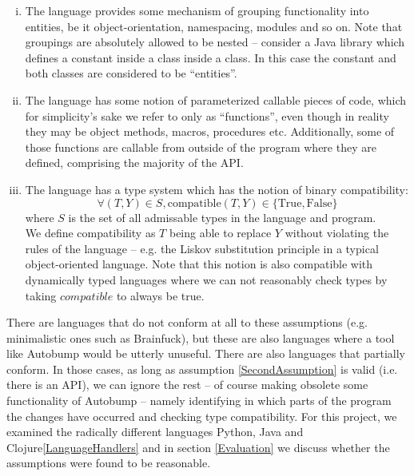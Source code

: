 \documentclass{l4proj}
\begin{document}
\begin{enumerate}[(i)]
\item The language provides some mechanism of grouping functionality
into entities, be it object-orientation, namespacing, modules and so
on. Note that groupings are absolutely allowed to be nested --
consider a Java library which defines a constant inside a class inside
a class. In this case the constant and both classes are considered to
be ``entities''.
\item The language has some notion of parameterized callable pieces of
code, which for simplicity's sake we refer to only as ``functions'',
even though in reality they may be object methods, macros, procedures etc.
Additionally, some of those functions are callable from outside of the
program where they are defined, comprising the majority of the API.
\label{SecondAssumption}
\item The language has a type system which has the notion of binary
compatibility:
\begin{equation}
\forall(T,Y) \in S, \mathrm{compatible}(T,Y) \in \{\mathrm{True},\mathrm{False}\}
\end{equation}
where $S$ is the set of all admissable types in the language and
program. \\

We define compatibility as $T$ being able to replace $Y$
without violating the rules of the language -- e.g. the Liskov
substitution principle\cite{Liskov} in a typical object-oriented
language. Note that this notion is also compatible with dynamically
typed languages where we can not reasonably check types by taking
$compatible$ to always be true.
\end{enumerate}

There are languages that do not conform at all to these assumptions
(e.g. minimalistic ones such as Brainfuck\cite{Brainfuck}), but these
are also languages where a tool like Autobump would be utterly
unuseful. There are also languages that partially conform. In those
cases, as long as assumption \ref{SecondAssumption} is valid (i.e.
there is an API), we can ignore the rest -- of course making obsolete
some functionality of Autobump -- namely identifying in which parts of
the program the changes have occurred and checking type compatibility.
For this project, we examined the radically different languages
Python, Java and Clojure\ref{LanguageHandlers} and in section
\ref{Evaluation} we discuss whether the assumptions were found to be
reasonable.
\end{document}
